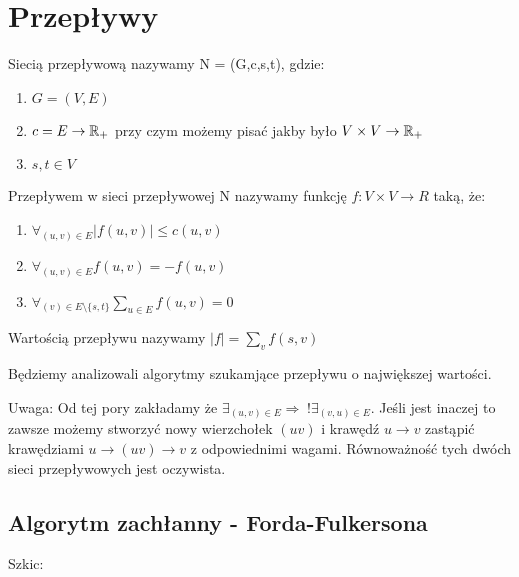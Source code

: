 \chapter{Przepływy}

\begin{defi}
    Siecią przepływową nazywamy N = (G,c,s,t), gdzie:
    \begin{enumerate}
        \item $G = (V,E)$
        \item $c = E \rightarrow \mathbb{R}_+$ przy czym możemy pisać jakby było $V \times V \rightarrow \mathbb{R}_+$ 
        \item $s,t \in V$
    \end{enumerate}
\end{defi}

\begin{defi}[Przepływ]
    Przepływem w sieci przepływowej N nazywamy funkcję $f: V \times V \rightarrow R$ taką, że:

    \begin{enumerate}
        \item $\forall_{(u,v) \in E} |f(u,v)| \le c(u,v)$
        \item $\forall_{(u,v) \in E} f(u,v) =- f(u,v)$
        \item $\forall_{(v) \in E\setminus \{s,t\}}  \sum_{u \in E} f(u,v) = 0$
    \end{enumerate}
\end{defi}

\begin{defi}
    Wartością przepływu nazywamy $|f| = \sum_v f(s,v)$
\end{defi}

Będziemy analizowali algorytmy szukamjące przepływu o największej wartości.

Uwaga: Od tej pory zakładamy że $\exists_{(u,v) \in E} \Rightarrow \hspace{3pt}!\exists_{(v,u) \in E}$. \newline Jeśli jest inaczej to zawsze możemy stworzyć nowy wierzchołek $(uv)$ i krawędź $ u \rightarrow v $ zastąpić krawędziami $ u \rightarrow (uv) \rightarrow v$ z odpowiednimi wagami. Równoważność tych dwóch sieci przepływowych jest oczywista.

\section{Algorytm zachłanny - Forda-Fulkersona}
Szkic:


